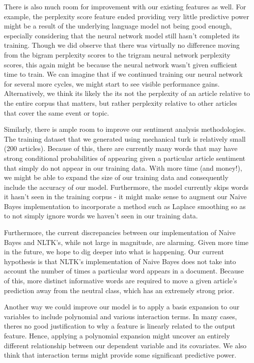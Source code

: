 \documentclass[fleqn,12pt]{SelfArx} %
\begin{document}
There is also much room for improvement with our existing features as well. For example, the perplexity score feature ended providing very little predictive power might be a result of the underlying language model not being good enough, especially considering that the neural network model still hasn't completed its training. Though we did observe that there was virtually no difference moving from the bigram perplexity scores to the trigram neural network perplexity scores, this again might be because the neural network wasn't given sufficient time to train. We can imagine that if we continued training our neural network for several more cycles, we might start to see visible performance gains. Alternatively, we think its likely the its not the perplexity of an article relative to the entire corpus that matters, but rather perplexity relative to other articles that cover the same event or topic. 

Similarly, there is ample room to improve our sentiment analysis methodologies. The training dataset that we generated using mechanical turk is relatively small (200 articles). Because of this, there are currently many words that may have strong conditional probabilities of appearing given a particular article sentiment that simply do not appear in our training data. With more time (and money!), we might be able to expand the size of our training data and consequently include the accuracy of our model. Furthermore, the model currently skips words it hasn't seen in the training corpus - it might make sense to augment our Naive Bayes implementation to incorporate a method such as Laplace smoothing so as to not simply ignore words we haven't seen in our training data.

Furthermore, the current discrepancies between our implementation of Naive Bayes and NLTK's, while not large in magnitude, are alarming. Given more time in the future, we hope to dig deeper into what is happening. Our current hypothesis is that NLTK's implementation of Naive Bayes does not take into account the number of times a particular word appears in a document. Because of this, more distinct informative words are required to move a given article's prediction away from the neutral class, which has an extremely strong prior.

Another way we could improve our model is to apply a basis expansion to our variables to include polynomial and various interaction terms. In many cases, theres no good justification to why a feature is linearly related to the output feature. Hence, applying a polynomial expansion might uncover an entirely different relationship between our dependent variable and its covariates. We also think that interaction terms might provide some significant predictive power. 
\end{document}
